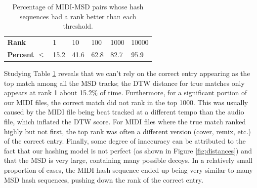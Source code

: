 \documentclass{article}
\begin{document}
\begin{table}
  \begin{center}
    \begin{tabular}{@{}llllll@{}}
      \toprule
      \textbf{Rank} & 1 & 10 & 100 & 1000 & 10000 \\
      \textbf{Percent $\le$} & 15.2 & 41.6 & 62.8 & 82.7 & 95.9 \\
      \bottomrule
    \end{tabular}
  \end{center}
  \caption{Percentage of MIDI-MSD pairs whose hash sequences had a rank better than each threshold.}
  \label{tab:rank-percentages}
\end{table}

Studying Table \ref{tab:rank-percentages} reveals that we can't rely on the correct entry appearing as the top match among all the MSD tracks; the DTW distance for true matches only appears at rank 1 about 15.2\% of time.
Furthermore, for a significant portion of our MIDI files, the correct match did not rank in the top 1000.
This was usually caused by the MIDI file being beat tracked at a different tempo than the audio file, which inflated the DTW score.
For MIDI files where the true match ranked highly but not first, the top rank was often a different version (cover, remix, etc.) of the correct entry.
Finally, some degree of inaccuracy can be attributed to the fact that our hashing model is not perfect (as shown in Figure \ref{fig:distances}) and that the MSD is very large, containing many possible decoys. 
In a relatively small proportion of cases, the MIDI hash sequence ended up being very similar to many MSD hash sequences, pushing down the rank of the correct entry.
\end{document}
